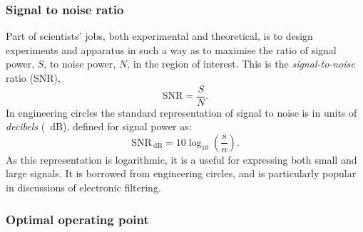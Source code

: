 \subsubsection{\label{sec:snr}Signal to noise ratio}

Part of scientists' jobs, both experimental and theoretical, is to design experiments and apparatus in such a way as to maximise the ratio of signal power, $S$, to noise power, $N$, in the region of interest. This is the \emph{signal-to-noise} ratio (SNR),
\begin{equation}
  \text{SNR} = \frac{S}{N}.
\end{equation}
In engineering circles the standard representation of signal to noise is in units of \emph{decibels} (\SI{}{\deci\bel}), defined for signal power as:
\begin{equation}
  \text{SNR}_{\SI{}{\deci\bel}} = 10 \log_{10} \left( \frac{s}{n} \right).
\end{equation}
As this representation is logarithmic, it is a useful for expressing both small and large signals. It is borrowed from engineering circles, and is particularly popular in discussions of electronic filtering.

\subsubsection{Optimal operating point}

